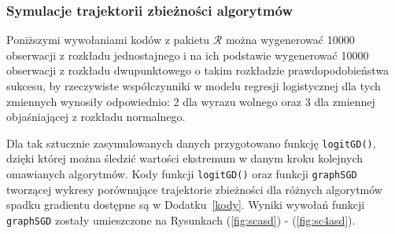 \newpage
\subsubsection{Symulacje trajektorii zbieżności algorytmów}
Poniższymi wywołaniami kodów z pakietu $\mathcal{R}$ \cite{programikr} można wygenerować 10000 obserwacji z rozkładu jednostajnego i na ich podstawie wygenerować 10000 obserwacji z rozkładu dwupunktowego o takim rozkładzie prawdopodobieństwa sukcesu, by rzeczywiste współczynniki w modelu regresji logistycznej dla tych zmiennych wynosiły odpowiednio: 2 dla wyrazu wolnego oraz 3 dla zmiennej objaśniającej z rozkładu normalnego. 
\begin{Shaded}
\begin{Highlighting}[]
\StringTok{ }\NormalTok{(}\NormalTok{)}
\StringTok{ } \NormalTok{+}\StringTok{ }
\StringTok{ }\NormalTok{/(}\NormalTok{+}
\StringTok{ }\NormalTok{(}\NormalTok{,}
\end{Highlighting}
\end{Shaded}

Dla tak sztucznie zasymulowanych danych przygotowano funkcję \texttt{logitGD()}, dzięki której można śledzić wartości ekstremum w danym kroku kolejnych omawianych algorytmów. Kody funkcji \texttt{logitGD()} oraz funkcji \texttt{graphSGD} tworzącej wykresy porównujące trajektorie zbieżności dla różnych algorytmów spadku gradientu  dostępne są w Dodatku~\ref{kody}. Wyniki wywołań funkcji \texttt{graphSGD} zostały umieszczone na Rysunkach (\ref{fig:scasd}) - (\ref{fig:sc4asd}).

